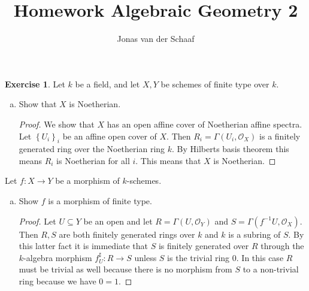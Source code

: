 \documentclass{article}
\title{Homework Algebraic Geometry 2}
\author{Jonas van der Schaaf}
\date{}
\newcommand{\sheaf}{\mathcal{O}}
\newcommand{\set}[1]{\left\{#1\right\}}
\theoremstyle{definition}
\newtheorem{question}{Exercise}
\begin{document}
\maketitle

\begin{question}
    Let \(k\) be a field, and let \(X,Y\) be schemes of finite type over \(k\).
    \begin{enumerate}[(a)]
        \item Show that \(X\) is Noetherian.

              \begin{proof}
                  We show that \(X\) has an open affine cover of Noetherian
                  affine spectra. Let \(\set{U_{i}}_{i}\) be an affine open
                  cover of \(X\). Then \(R_{i}=\Gamma(U_{i},\sheaf_{X})\) is a
                  finitely generated ring over the Noetherian ring \(k\). By
                  Hilberts basis theorem this means \(R_{i}\) is Noetherian for
                  all \(i\). This means that \(X\) is Noetherian.
              \end{proof}
    \end{enumerate}
    Let \(f:X\to Y\) be a morphism of \(k\)-schemes.
    \begin{enumerate}[(a), resume]
        \item Show \(f\) is a morphism of finite type.

              \begin{proof}
                  Let \(U\subseteq Y\) be an open and let
                  \(R=\Gamma(U,\sheaf_{Y})\) and
                  \(S=\Gamma(f^{-1}U,\sheaf_{X})\). Then \(R,S\) are both
                  finitely generated rings over \(k\) and \(k\) is a subring of
                  \(S\). By this latter fact it is immediate that \(S\) is
                  finitely generated over \(R\) through the \(k\)-algebra
                  morphism \(f^{\sharp}_{U}:R\to S\) unless \(S\) is the trivial
                  ring \(0\). In this case \(R\) must be trivial as well because
                  there is no morphism from \(S\) to a non-trivial ring because
                  we have \(0=1\).
              \end{proof}
    \end{enumerate}
\end{question}
\end{document}

